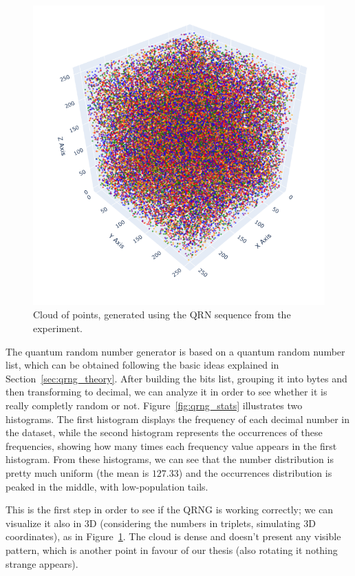 \documentclass[prl,twocolumn]{revtex4-1}
\begin{document}
\begin{figure}[!b]
    \centering
    \includegraphics[width=0.8\linewidth]{Images/QRNG.png}
    \caption{Cloud of points, generated using the QRN sequence from the experiment.}
    \label{fig:QRNG}
\end{figure}

The quantum random number generator is based on a quantum random number list, which can be obtained following the basic ideas explained in Section~\ref{sec:qrng_theory}. After building the bits list, grouping it into bytes and then transforming to decimal, we can analyze it in order to see whether it is really completly random or not. Figure~\ref{fig:qrng_stats} illustrates two histograms. The first histogram displays the frequency of each decimal number in the dataset, while the second histogram represents the occurrences of these frequencies, showing how many times each frequency value appears in the first histogram. From these histograms, we can see that the number distribution is pretty much uniform (the mean is $127.33$) and the occurrences distribution is peaked in the middle, with low-population tails. 

This is the first step in order to see if the QRNG is working correctly; we can visualize it also in 3D (considering the numbers in triplets, simulating 3D coordinates), as in Figure~\ref{fig:QRNG}. The cloud is dense and doesn't present any visible pattern, which is another point in favour of our thesis (also rotating it nothing strange appears). 
\end{document}
